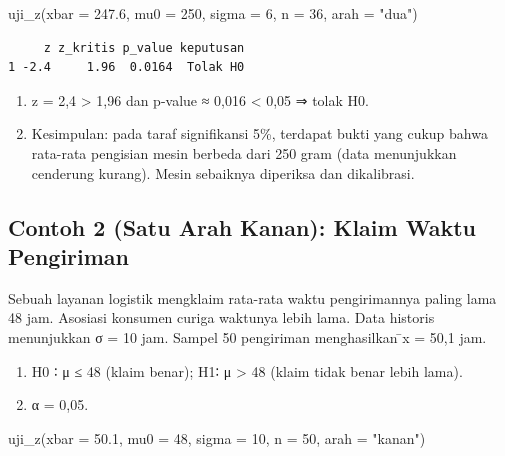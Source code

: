 \documentclass[
  indonesian,
  letterpaper,
]{book}
\newenvironment{Shaded}{\begin{snugshade}}{\end{snugshade}}
\newcommand{\AttributeTok}[1]{\textcolor[rgb]{0.40,0.45,0.13}{#1}}
\newcommand{\DecValTok}[1]{\textcolor[rgb]{0.68,0.00,0.00}{#1}}
\newcommand{\FloatTok}[1]{\textcolor[rgb]{0.68,0.00,0.00}{#1}}
\newcommand{\FunctionTok}[1]{\textcolor[rgb]{0.28,0.35,0.67}{#1}}
\newcommand{\NormalTok}[1]{\textcolor[rgb]{0.00,0.23,0.31}{#1}}
\newcommand{\StringTok}[1]{\textcolor[rgb]{0.13,0.47,0.30}{#1}}
\begin{document}
\begin{Shaded}
\begin{Highlighting}[]
\FunctionTok{uji\_z}\NormalTok{(}\AttributeTok{xbar =} \FloatTok{247.6}\NormalTok{, }\AttributeTok{mu0 =} \DecValTok{250}\NormalTok{, }\AttributeTok{sigma =} \DecValTok{6}\NormalTok{, }\AttributeTok{n =} \DecValTok{36}\NormalTok{, }\AttributeTok{arah =} \StringTok{"dua"}\NormalTok{)}
\end{Highlighting}
\end{Shaded}

\begin{verbatim}
     z z_kritis p_value keputusan
1 -2.4     1.96  0.0164  Tolak H0
\end{verbatim}

\begin{enumerate}
\def\labelenumi{\arabic{enumi}.}
\setcounter{enumi}{3}
\item
  \textbar z\textbar{} = 2,4 \textgreater{} 1,96 dan p-value ≈ 0,016
  \textless{} 0,05 ⇒ tolak H0.
\item
  Kesimpulan: pada taraf signifikansi 5\%, terdapat bukti yang cukup
  bahwa rata-rata pengisian mesin berbeda dari 250 gram (data
  menunjukkan cenderung kurang). Mesin sebaiknya diperiksa dan
  dikalibrasi.
\end{enumerate}

\subsection{Contoh 2 (Satu Arah Kanan): Klaim Waktu
Pengiriman}\label{contoh-2-satu-arah-kanan-klaim-waktu-pengiriman}

Sebuah layanan logistik mengklaim rata-rata waktu pengirimannya paling
lama 48 jam. Asosiasi konsumen curiga waktunya lebih lama. Data historis
menunjukkan σ = 10 jam. Sampel 50 pengiriman menghasilkan ̄x = 50,1 jam.

\begin{enumerate}
\def\labelenumi{\arabic{enumi}.}
\item
  H0 ∶ μ ≤ 48 (klaim benar); H1∶ μ \textgreater{} 48 (klaim tidak benar
  lebih lama).
\item
  α = 0,05.
\end{enumerate}

\begin{Shaded}
\begin{Highlighting}[]
\FunctionTok{uji\_z}\NormalTok{(}\AttributeTok{xbar =} \FloatTok{50.1}\NormalTok{, }\AttributeTok{mu0 =} \DecValTok{48}\NormalTok{, }\AttributeTok{sigma =} \DecValTok{10}\NormalTok{, }\AttributeTok{n =} \DecValTok{50}\NormalTok{, }\AttributeTok{arah =} \StringTok{"kanan"}\NormalTok{)}
\end{Highlighting}
\end{Shaded}
\end{document}
